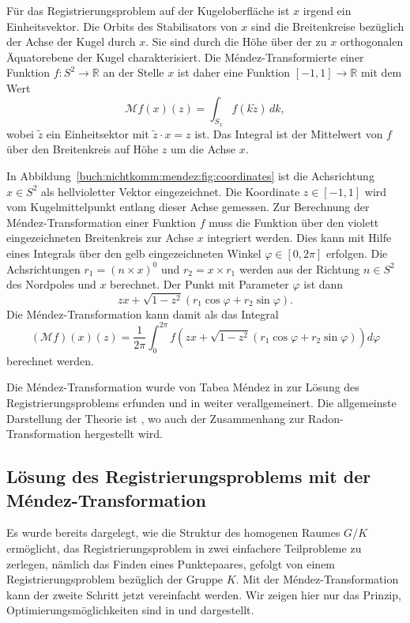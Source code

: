 \begin{beispiel}

Für das Registrierungsproblem auf der Kugeloberfläche ist $x$ irgend ein
Einheitsvektor.
Die Orbits des Stabilisators von $x$ sind die Breitenkreise bezüglich
der Achse der Kugel durch $x$.
Sie sind durch die Höhe über der zu $x$ orthogonalen Äquatorebene der
Kugel charakterisiert.
Die Méndez-Transformierte einer Funktion $f\colon S^2\to \mathbb{R}$
an der Stelle $x$ ist daher eine Funktion $[-1,1]\to\mathbb{R}$ mit
dem Wert
\[
\mathcal{M}f (x)(z)
=
\int_{S_x} f(k\tilde{z})\,dk,
\]
wobei $\tilde{z}$ ein Einheitsektor mit $\tilde{z}\cdot x=z$ ist.
Das Integral ist der Mittelwert von $f$ über den Breitenkreis
auf Höhe $z$ um die Achse $x$.

In Abbildung~\ref{buch:nichtkomm:mendez:fig:coordinates} ist die
Achsrichtung $x\in S^2$ als hellvioletter Vektor eingezeichnet.
Die Koordinate $z\in[-1,1]$ wird vom Kugelmittelpunkt entlang dieser
Achse gemessen.
Zur Berechnung der Méndez-Transformation einer Funktion $f$ muss die
Funktion über den violett eingezeichneten Breitenkreis zur Achse $x$
integriert werden.
Dies kann mit Hilfe eines Integrals über den gelb eingezeichneten
Winkel $\varphi\in[0,2\pi]$ erfolgen.
Die Achsrichtungen $r_1=(n\times x)^0$ und $r_2=x\times r_1$ werden
aus der Richtung $n\in S^2$ des Nordpoles und $x$ berechnet.
Der Punkt mit Parameter $\varphi$ ist dann
\[
zx
+
\!\sqrt{1-z^2}(r_1 \cos\varphi + r_2 \sin\varphi).
\]
Die Méndez-Transformation kann damit als das Integral
\[
(\mathcal{M}f)(x)(z)
=
\frac{1}{2\pi}
\int_0^{2\pi}
f\left(
zx
+
\!\sqrt{1-z^2}(r_1 \cos\varphi + r_2 \sin\varphi)
\right)
d\varphi
\]
berechnet werden.
\end{beispiel}

Die Méndez-Transformation wurde von Tabea Méndez in 
\cite{buch:mendez} zur Lösung des Registrierungsproblems erfunden
und in \cite{buch:mendez-mueller} weiter verallgemeinert.
Die allgemeinste Darstellung der Theorie ist \cite[chapter 3]{buch:reg},
wo auch der Zusammenhang zur Radon-Transformation hergestellt wird.

%
%
\subsection{Lösung des Registrierungsproblems mit der Méndez-Transformation}
Es wurde bereits dargelegt, wie die Struktur des homogenen Raumes $G/K$
ermöglicht, das Registrierungsproblem in zwei einfachere Teilprobleme
zu zerlegen, nämlich das Finden eines Punktepaares, gefolgt von einem
Registrierungsproblem bezüglich der Gruppe $K$.
Mit der Méndez-Transformation kann der zweite Schritt jetzt vereinfacht
werden.
Wir zeigen hier nur das Prinzip, Optimierungsmöglichkeiten sind in
\cite{buch:mendez-mueller} und \cite{buch:reg} dargestellt.

